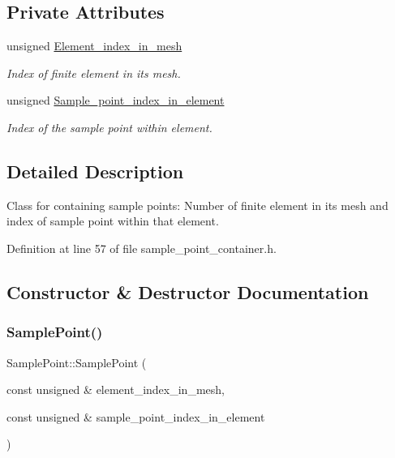 \subsection*{Private Attributes}
\begin{DoxyCompactItemize}
\item 
unsigned \hyperlink{classSamplePoint_ac2fcd449feb15e9fdf348b946b60ae37}{Element\+\_\+index\+\_\+in\+\_\+mesh}
\begin{DoxyCompactList}\small\item\em Index of finite element in its mesh. \end{DoxyCompactList}\item 
unsigned \hyperlink{classSamplePoint_a7901c8c1880e5a7ff4e03507dce3b728}{Sample\+\_\+point\+\_\+index\+\_\+in\+\_\+element}
\begin{DoxyCompactList}\small\item\em Index of the sample point within element. \end{DoxyCompactList}\end{DoxyCompactItemize}


\subsection{Detailed Description}
Class for containing sample points\+: Number of finite element in its mesh and index of sample point within that element. 

Definition at line 57 of file sample\+\_\+point\+\_\+container.\+h.



\subsection{Constructor \& Destructor Documentation}
\mbox{\label{classSamplePoint_a19d7c1b8e810ea533765acabcea312b5}} 
\subsubsection{\texorpdfstring{Sample\+Point()}{SamplePoint()}\hspace{0.1cm}{\footnotesize\ttfamily [1/2]}}
{\footnotesize\ttfamily Sample\+Point\+::\+Sample\+Point (\begin{DoxyParamCaption}\item[{const unsigned \&}]{element\+\_\+index\+\_\+in\+\_\+mesh,  }\item[{const unsigned \&}]{sample\+\_\+point\+\_\+index\+\_\+in\+\_\+element }\end{DoxyParamCaption})\hspace{0.3cm}{\ttfamily [inline]}}



